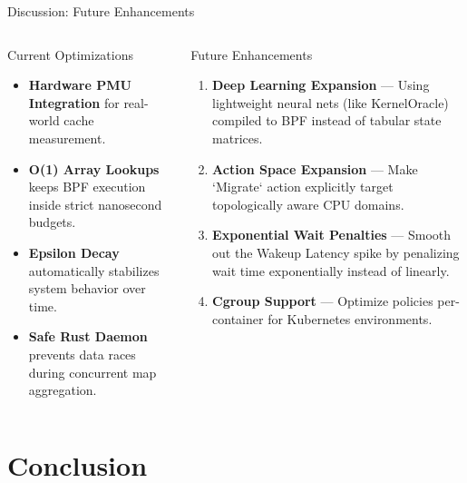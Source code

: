 \documentclass[aspectratio=169]{beamer}
\begin{document}
\begin{frame}{Discussion: Future Enhancements}
  \begin{columns}[T]
      \begin{block}{Current Optimizations}
        \begin{itemize}\small\itemsep3pt
          \item \textbf{Hardware PMU Integration} for real-world cache measurement.
          \item \textbf{O(1) Array Lookups} keeps BPF execution inside strict nanosecond budgets.
          \item \textbf{Epsilon Decay} automatically stabilizes system behavior over time.
          \item \textbf{Safe Rust Daemon} prevents data races during concurrent map aggregation.
        \end{itemize}
      \end{block}
      \begin{block}{Future Enhancements}
        \begin{enumerate}\small\itemsep3pt
          \item \textbf{Deep Learning Expansion} — Using lightweight neural nets (like KernelOracle) compiled to BPF instead of tabular state matrices.
          \item \textbf{Action Space Expansion} — Make `Migrate` action explicitly target topologically aware CPU domains.
          \item \textbf{Exponential Wait Penalties} — Smooth out the Wakeup Latency spike by penalizing wait time exponentially instead of linearly.
          \item \textbf{Cgroup Support} — Optimize policies per-container for Kubernetes environments.
        \end{enumerate}
      \end{block}
  \end{columns}
\end{frame}

\section{Conclusion}
\end{document}
